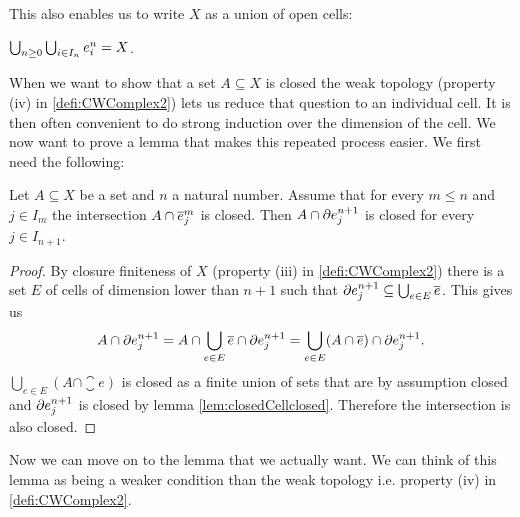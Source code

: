 This also enables us to write $X$ as a union of open cells:

\begin{cor}
    $\bigcup_{n \ge 0}\bigcup_{i \in I_n} \openCell{n}{i} = X$.
\end{cor}

When we want to show that a set $A \subseteq X$ is closed the weak topology (property (iv) in \ref{defi:CWComplex2}) lets us reduce that question to an individual cell.
It is then often convenient to do strong induction over the dimension of the cell.
We now want to prove a lemma that makes this repeated process easier.
We first need the following:

\begin{lem}\label{lem:inductioncellFrontierclosed}
    Let $A \subseteq X$ be a set and $n$ a natural number.
    Assume that for every $m \le n$ and $j \in I_m$ the intersection $A \cap \closedCell{m}{j}$ is closed.
    Then $A \cap \cellFrontier{n + 1}{j}$ is closed for every $j \in I_{n + 1}$.
\end{lem}
\begin{proof}
    By closure finiteness of $X$ (property (iii) in \ref{defi:CWComplex2}) there is a set $E$ of cells of dimension lower than $n + 1$ such that $\cellFrontier{n + 1}{j} \subseteq \bigcup_{e \in E}\closure{e}$.
    This gives us
    \[A \cap \cellFrontier{n + 1}{j} = A \cap \bigcup_{e \in E}\closure{e} \cap \cellFrontier{n + 1}{j} = \bigcup_{e \in E}(A \cap \closure{e}) \cap \cellFrontier{n + 1}{j}.\]
    $\bigcup_{e \in E}(A \cap \closure{e})$ is closed as a finite union of sets that are by assumption closed and $\cellFrontier{n + 1}{j}$ is closed by lemma \ref{lem:closedCellclosed}. Therefore the intersection is also closed.
\end{proof}

Now we can move on to the lemma that we actually want.
We can think of this lemma as being a weaker condition than the weak topology i.e. property (iv) in \ref{defi:CWComplex2}.

